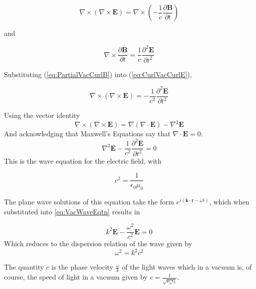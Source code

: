 \documentclass[twocolumn]{article}
\begin{document}
\begin{equation}
	\label{eq:CurlVacCurlE}
	\nabla \times ( \nabla \times \mathbf{E}) = \nabla \times (-\frac{1}{c} \frac{\partial \mathbf{B}}{\partial t}) 
\end{equation}
\begin{center}
	and
\end{center}
\begin{equation}
	\label{eq:PartialVacCurlB}
	\nabla \times \frac{\partial \mathbf{B}}{\partial t} = \frac{1}{c} \frac{\partial^2 \mathbf{E}}{\partial t^2}
\end{equation}

Substituting (\ref{eq:PartialVacCurlB}) into (\ref{eq:CurlVacCurlE}),

\begin{equation}
	\nabla \times ( \nabla \times \mathbf{E}) = -\frac{1}{c^2} \frac{\partial^2 \mathbf{E}}{\partial t^2} 
\end{equation}

Using the vector identity
\begin{equation}
	\label{eq:NablaIdent}
	\nabla \times (\nabla \times \mathbf{E}) = \nabla(\nabla \cdot \mathbf{E}) - \nabla^2\mathbf{E}
\end{equation}
And acknowledging that Maxwell's Equations say that $\nabla \cdot \mathbf{E} = 0$:
\begin{equation}
	\label{eq:VacWaveEqtn}
	\nabla^2\mathbf{E} - \frac{1}{c^2} \frac{\partial^2 \mathbf{E}}{\partial t^2} = 0
\end{equation}
This is the wave equation for the electric field, with

\begin{equation}
	c^2 = \frac{1}{\epsilon_0 \mu_0}
\end{equation}

The plane wave solutions of this equation take the form $e^{i(\mathbf{k} \cdot \mathbf{r} - \omega t)}$, which when substituted into \ref{eq:VacWaveEqtn} results in

\begin{equation}
	k^2\mathbf{E} - \frac{\omega^2}{c^2}\mathbf{E} = 0
\end{equation}
Which reduces to the dispersion relation of the wave given by
\begin{equation}
	\omega^2 = k^2c^2
\end{equation}

The quantity $c$ is the phase velocity $\frac{\omega}{k}$ of the light waves which in a vacuum is, of course, the speed of light in a vacuum given by $c = \frac{1}{\sqrt{\mu_0\epsilon_0}}$.
\end{document}
